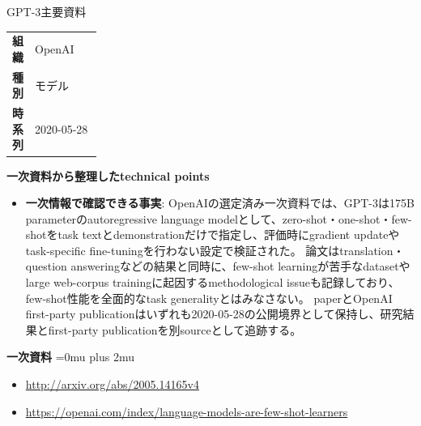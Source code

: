 \begin{technicalnote}{GPT-3}{主要資料}
\begingroup
\begin{tabularx}{\linewidth}{@{}>{\bfseries}p{0.22\linewidth}X@{}}
組織 & OpenAI \\
種別 & モデル \\
時系列 & 2020-05-28 \\
\end{tabularx}
\smallskip
{\bfseries 一次資料から整理したtechnical points}
\begin{itemize}[leftmargin=1.5em,itemsep=0.35em]
\item \textbf{一次情報で確認できる事実}: OpenAIの選定済み一次資料では、GPT-3は175B parameterのautoregressive language modelとして、zero-shot・one-shot・few-shotをtask textとdemonstrationだけで指定し、評価時にgradient updateやtask-specific fine-tuningを行わない設定で検証された。 論文はtranslation・question answeringなどの結果と同時に、few-shot learningが苦手なdatasetやlarge web-corpus trainingに起因するmethodological issueも記録しており、few-shot性能を全面的なtask generalityとはみなさない。 paperとOpenAI first-party publicationはいずれも2020-05-28の公開境界として保持し、研究結果とfirst-party publicationを別sourceとして追跡する。
\end{itemize}
\begin{minipage}{\linewidth}
\begin{samepage}
{\bfseries 一次資料}
\begingroup\sloppy
\Urlmuskip=0mu plus 2mu\relax
\begin{itemize}[leftmargin=1.5em,itemsep=0.25em]
\item {\scriptsize\url{http://arxiv.org/abs/2005.14165v4}}
\item {\scriptsize\url{https://openai.com/index/language-models-are-few-shot-learners}}
\end{itemize}
\endgroup
\end{samepage}
\end{minipage}
\endgroup
\end{technicalnote}
\medskip
